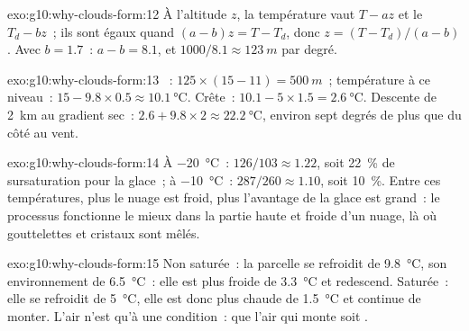 \begin{solution}{exo:g10:why-clouds-form:12}
À l'altitude $z$, la température vaut $T - a z$ et le 
$T_d - b z$~; ils sont égaux quand $(a - b) z = T - T_d$, donc
$z = (T - T_d)/(a - b)$. Avec $b = 1.7$~: $a - b = 8.1$, et
$1000/8.1 \approx \qty{123}{m}$ par degré.
\end{solution}

\begin{solution}{exo:g10:why-clouds-form:13}
~: $125 \times (15 - 11) = \qty{500}{m}$~; température
à ce niveau~: $15 - 9.8 \times 0.5 \approx \qty{10.1}{\degreeCelsius}$.
Crête~: $10.1 - 5
\times 1.5 = \qty{2.6}{\degreeCelsius}$. Descente de \qty{2}{km} au gradient
sec~: $2.6 + 9.8 \times 2 \approx \qty{22.2}{\degreeCelsius}$, environ sept
degrés de plus que du côté au vent.
\end{solution}

\begin{solution}{exo:g10:why-clouds-form:14}
À \qty{-20}{\degreeCelsius}~: $126/103 \approx 1.22$, soit
\qty{22}{\percent} de sursaturation pour la glace~; à
\qty{-10}{\degreeCelsius}~: $287/260 \approx
1.10$, soit \qty{10}{\percent}. Entre ces températures, plus le nuage est
froid, plus l'avantage de la glace est grand~: le processus fonctionne le
mieux dans la partie haute et froide d'un nuage, là où gouttelettes et
cristaux sont mêlés.
\end{solution}

\begin{solution}{exo:g10:why-clouds-form:15}
Non saturée~: la parcelle se refroidit de \qty{9.8}{\degreeCelsius}, son
environnement de \qty{6.5}{\degreeCelsius}~: elle est plus froide de
\qty{3.3}{\degreeCelsius} et redescend. Saturée~: elle se refroidit de
\qty{5}{\degreeCelsius}, elle est donc plus chaude de
\qty{1.5}{\degreeCelsius} et continue de monter. L'air n'est  qu'à
une condition~: que l'air qui monte soit .
\end{solution}


